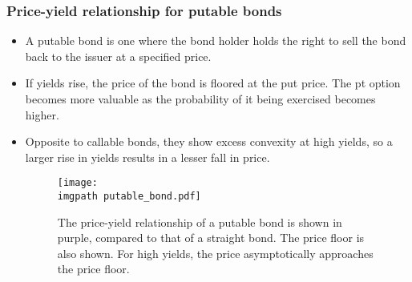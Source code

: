 \documentclass[../notes_compiled.tex]{subfiles}
\begin{document}
\subsubsection{Price-yield relationship for putable bonds}
\begin{itemize}
\item A putable bond is one where the bond holder holds the right to sell the bond back to the issuer at a specified price.
\item If yields rise, the price of the bond is floored at the put price. The pt option becomes more valuable as the probability of it being exercised becomes higher.
\item Opposite to callable bonds, they show excess convexity at high yields, so a larger rise in yields results in a lesser fall in price.

\begin{figure}[h]
  \centering
  \texttt{[image: \\imgpath putable\_bond.pdf]}
  \caption{The price-yield relationship of a putable bond is shown in purple, compared to that of a straight bond. The price floor is also shown. For high yields, the price asymptotically approaches the price floor.}
\end{figure}
\end{itemize}
\end{document}
